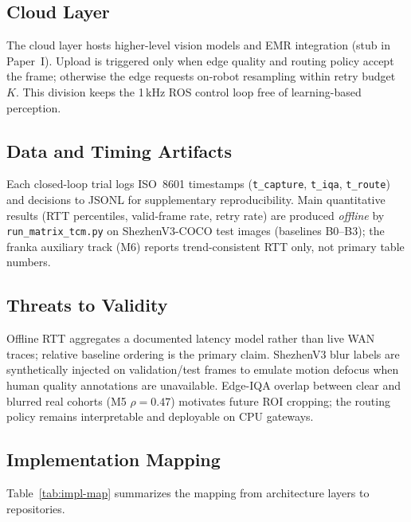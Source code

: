 \subsection{Cloud Layer}
The cloud layer hosts higher-level vision models and EMR integration (stub in Paper~I).
Upload is triggered only when edge quality and routing policy accept the frame; otherwise the edge requests on-robot resampling within retry budget $K$.
This division keeps the 1\,kHz ROS control loop free of learning-based perception.

\subsection{Data and Timing Artifacts}
Each closed-loop trial logs ISO~8601 timestamps (\texttt{t\_capture}, \texttt{t\_iqa}, \texttt{t\_route}) and decisions to JSONL for supplementary reproducibility.
Main quantitative results (RTT percentiles, valid-frame rate, retry rate) are produced \emph{offline} by \texttt{run\_matrix\_tcm.py} on ShezhenV3-COCO test images (baselines B0--B3); the franka auxiliary track (M6) reports trend-consistent RTT only, not primary table numbers.

\subsection{Threats to Validity}
Offline RTT aggregates a documented latency model rather than live WAN traces; relative baseline ordering is the primary claim.
ShezhenV3 blur labels are synthetically injected on validation/test frames to emulate motion defocus when human quality annotations are unavailable.
Edge-IQA overlap between clear and blurred real cohorts (M5 $\rho{=}0.47$) motivates future ROI cropping; the routing policy remains interpretable and deployable on CPU gateways.

\subsection{Implementation Mapping}
Table~\ref{tab:impl-map} summarizes the mapping from architecture layers to repositories.

\begin{table}[t]
\centering
\caption{Layer-to-repository mapping (Paper~I).}
\label{tab:impl-map}
\small
{}
\end{table}

